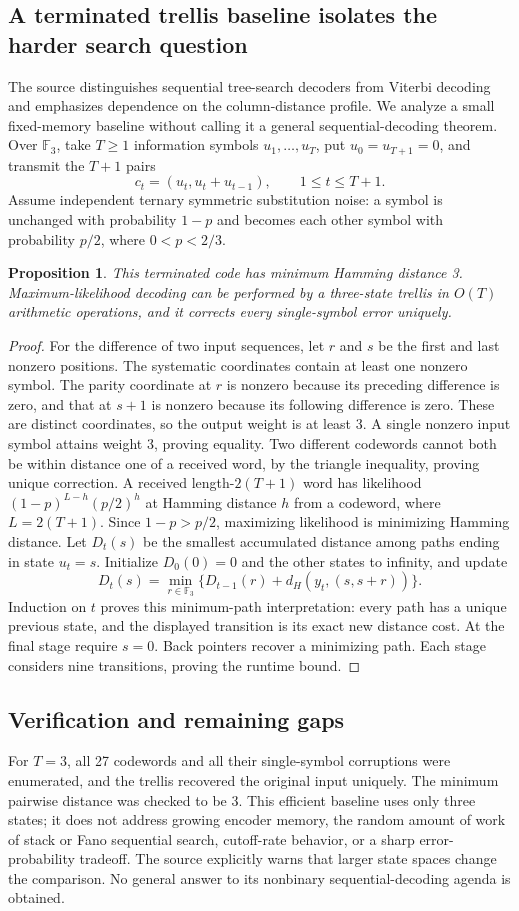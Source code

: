 \documentclass[11pt]{article}
\newtheorem{proposition}{Proposition}
\begin{document}
\subsection{A terminated trellis baseline isolates the harder search question}
The source distinguishes sequential tree-search decoders from Viterbi decoding and emphasizes dependence on the column-distance profile. We analyze a small fixed-memory baseline without calling it a general sequential-decoding theorem. Over $\mathbb F_3$, take $T\ge1$ information symbols $u_1,\ldots,u_T$, put $u_0=u_{T+1}=0$, and transmit the $T+1$ pairs
\[
c_t=(u_t,u_t+u_{t-1}),\qquad 1\le t\le T+1.
\]
Assume independent ternary symmetric substitution noise: a symbol is unchanged with probability $1-p$ and becomes each other symbol with probability $p/2$, where $0<p<2/3$.
\begin{proposition}
This terminated code has minimum Hamming distance 3. Maximum-likelihood decoding can be performed by a three-state trellis in $O(T)$ arithmetic operations, and it corrects every single-symbol error uniquely.
\end{proposition}
\begin{proof}
For the difference of two input sequences, let $r$ and $s$ be the first and last nonzero positions. The systematic coordinates contain at least one nonzero symbol. The parity coordinate at $r$ is nonzero because its preceding difference is zero, and that at $s+1$ is nonzero because its following difference is zero. These are distinct coordinates, so the output weight is at least 3. A single nonzero input symbol attains weight 3, proving equality. Two different codewords cannot both be within distance one of a received word, by the triangle inequality, proving unique correction.
A received length-$2(T+1)$ word has likelihood $(1-p)^{L-h}(p/2)^h$ at Hamming distance $h$ from a codeword, where $L=2(T+1)$. Since $1-p>p/2$, maximizing likelihood is minimizing Hamming distance. Let $D_t(s)$ be the smallest accumulated distance among paths ending in state $u_t=s$. Initialize $D_0(0)=0$ and the other states to infinity, and update
\[
D_t(s)=\min_{r\in\mathbb F_3}\{D_{t-1}(r)+d_H(y_t,(s,s+r))\}.
\]
Induction on $t$ proves this minimum-path interpretation: every path has a unique previous state, and the displayed transition is its exact new distance cost. At the final stage require $s=0$. Back pointers recover a minimizing path. Each stage considers nine transitions, proving the runtime bound.
\end{proof}
\subsection{Verification and remaining gaps}
For $T=3$, all 27 codewords and all their single-symbol corruptions were enumerated, and the trellis recovered the original input uniquely. The minimum pairwise distance was checked to be 3. This efficient baseline uses only three states; it does not address growing encoder memory, the random amount of work of stack or Fano sequential search, cutoff-rate behavior, or a sharp error-probability tradeoff. The source explicitly warns that larger state spaces change the comparison. No general answer to its nonbinary sequential-decoding agenda is obtained.
\end{document}
